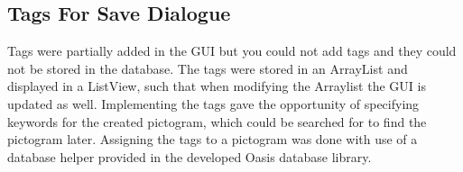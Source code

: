 \subsection{Tags For Save Dialogue}
Tags were partially added in the GUI but you could not add tags and they could not be stored in the database.
The tags were stored in an ArrayList and displayed in a ListView, such that when modifying the Arraylist the GUI is updated as well.
Implementing the tags gave the opportunity of specifying keywords for the created pictogram, which could be searched for to find the pictogram later.
Assigning the tags to a pictogram was done with use of a database helper provided in the developed Oasis database library.
